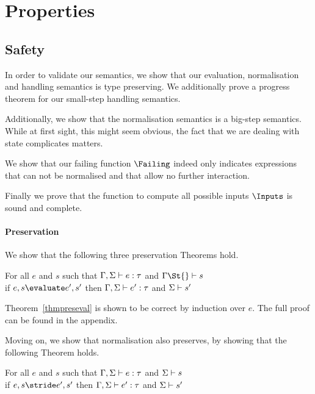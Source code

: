 
\section{Properties}

\subsection{Safety}

In order to validate our semantics, we show that our evaluation, normalisation
and handling semantics is type preserving. We additionally prove a progress
theorem for our small-step handling semantics.

Additionally, we show that the normalisation semantics is a big-step semantics.
While at first sight, this might seem obvious, the fact that we are dealing with
state complicates matters.

We show that our failing function $\Failing$ indeed only indicates expressions
that can not be normalised and that allow no further interaction.

Finally we prove that the function to compute all possible inputs $\Inputs$ is sound and complete.

\paragraph{Preservation}

We show that the following three preservation Theorems hold.

\begin{theorem}
      For all $e$ and $s$ such that
      $\Gamma,\Sigma\vdash e:\tau$ and $\Gamma\St{}\infers s$\\
      if $e,s\evaluate e',s'$
      then $\Gamma,\Sigma\vdash e':\tau$ and $\Sigma\vdash s'$
      \label{thmpreseval}
\end{theorem}

Theorem~\ref{thmpreseval} is shown to be correct by induction over $e$. The full
proof can be found in the appendix.


Moving on, we show that normalisation also preserves, by showing that the
following Theorem holds.

\begin{theorem}
    For all $e$ and $s$ such that $\Gamma,\Sigma\vdash e:\tau$ and $\Sigma\vdash s$\\
    if   $e,s \stride e',s'$ then $\Gamma,\Sigma\vdash e':\tau$ and $\Sigma\vdash s'$
    \label{thmpresnorm}
\end{theorem}

